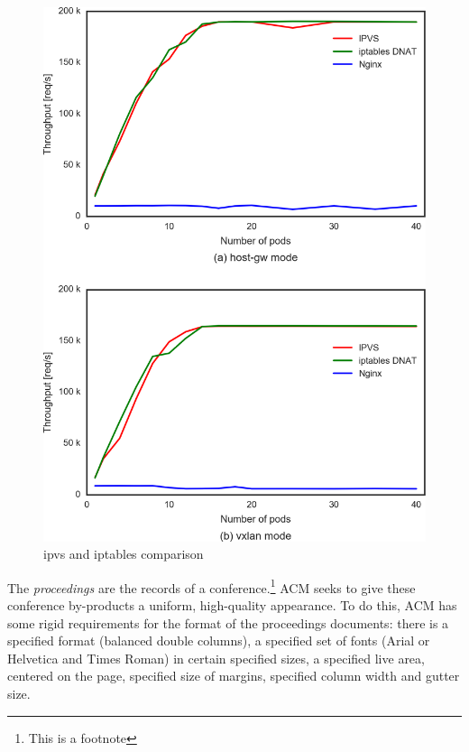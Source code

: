 \begin{figure}
\includegraphics[width=\columnwidth]{Figs/ipvs-iptables-nginx_2figs}
\caption{ipvs and iptables comparison}
\label{fig:ipvs-iptables-nginx_2figs}
\end{figure}



The \textit{proceedings} are the records of a conference.\footnote{This
  is a footnote}  ACM seeks
to give these conference by-products a uniform, high-quality
appearance.  To do this, ACM has some rigid requirements for the
format of the proceedings documents: there is a specified format
(balanced double columns), a specified set of fonts (Arial or
Helvetica and Times Roman) in certain specified sizes, a specified
live area, centered on the page, specified size of margins, specified
column width and gutter size.

